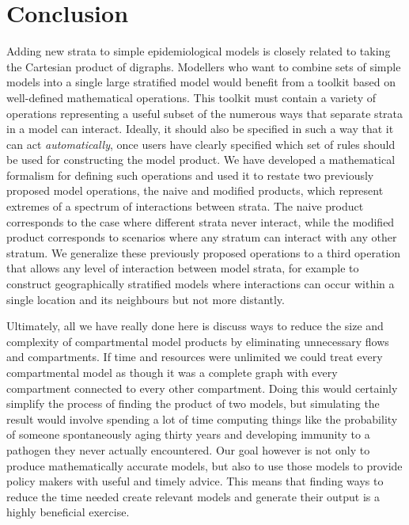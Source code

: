 \section{Conclusion}\label{conc}

Adding new strata to simple epidemiological models is closely related to taking the Cartesian product of digraphs. Modellers who want to combine sets of simple models into a single large stratified model would benefit from a toolkit based on well-defined mathematical operations. This toolkit must contain a variety of operations representing a useful subset of the numerous ways that separate strata in a model can interact. Ideally, it should also be specified in such a way that it can act \emph{automatically}, once users have clearly specified which set of rules should be used for constructing the model product. We have developed a mathematical formalism for defining such operations and used it to restate two previously proposed model operations, the naive and modified products, which represent extremes of a spectrum of interactions between strata. The naive product corresponds to the case where different strata never interact, while the modified product corresponds to scenarios where any stratum can interact with any other stratum. We generalize these previously proposed operations to a third operation that allows any level of interaction between model strata, for example to construct geographically stratified models where interactions can occur within a single location and its neighbours but not more distantly.

Ultimately, all we have really done here is discuss ways to reduce the size and complexity of compartmental model products by eliminating unnecessary flows and compartments. If time and resources were unlimited we could treat every compartmental model as though it was a complete graph with every compartment connected to every other compartment. Doing this would certainly simplify the process of finding the product of two models, but simulating the result would involve spending a lot of time computing things like the probability of someone spontaneously aging thirty years and developing immunity to a pathogen they never actually encountered. Our goal however is not only to produce mathematically accurate models, but also to use those models to provide policy makers with useful and timely advice. This means that finding ways to reduce the time needed create relevant models and generate their output is a highly beneficial exercise.

